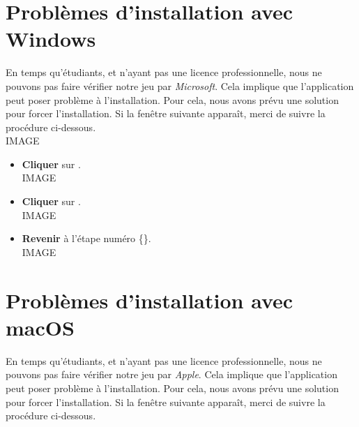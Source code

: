 \documentclass[a4paper,12pt]{article}
\begin{document}
    \section{Problèmes d'installation avec Windows}
        En temps qu'étudiants, et n'ayant pas une licence professionnelle, nous ne pouvons 
        pas faire vérifier notre jeu par \textsl{Microsoft}.
        Cela implique que l'application peut poser problème à l'installation.
        Pour cela, nous avons prévu une solution pour forcer l'installation.
        Si la fenêtre suivante apparaît, merci de suivre la procédure ci-dessous.
        \\IMAGE
        \begin{itemize}
            \item 
                \textbf{Cliquer} sur .
                \\IMAGE
            \item
            \textbf{Cliquer} sur .
                \\IMAGE
            \item
            \textbf{Revenir} à l'étape numéro \{\}.
                \\IMAGE
        \end{itemize}


    \clearpage
    \section{Problèmes d'installation avec macOS}
        En temps qu'étudiants, et n'ayant pas une licence professionnelle, nous ne pouvons 
        pas faire vérifier notre jeu par \textsl{Apple}.
        Cela implique que l'application peut poser problème à l'installation.
        Pour cela, nous avons prévu une solution pour forcer l'installation.
        Si la fenêtre suivante apparaît, merci de suivre la procédure ci-dessous.
\end{document}
